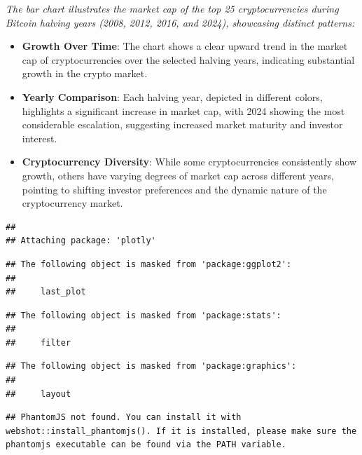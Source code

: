\documentclass[
]{article}
\begin{document}
\emph{The bar chart illustrates the market cap of the top 25
cryptocurrencies during Bitcoin halving years (2008, 2012, 2016, and
2024), showcasing distinct patterns:}

\begin{itemize}
\item
  \textbf{Growth Over Time}: The chart shows a clear upward trend in the
  market cap of cryptocurrencies over the selected halving years,
  indicating substantial growth in the crypto market.
\item
  \textbf{Yearly Comparison}: Each halving year, depicted in different
  colors, highlights a significant increase in market cap, with 2024
  showing the most considerable escalation, suggesting increased market
  maturity and investor interest.
\item
  \textbf{Cryptocurrency Diversity}: While some cryptocurrencies
  consistently show growth, others have varying degrees of market cap
  across different years, pointing to shifting investor preferences and
  the dynamic nature of the cryptocurrency market.
\end{itemize}

\begin{verbatim}
## 
## Attaching package: 'plotly'
\end{verbatim}

\begin{verbatim}
## The following object is masked from 'package:ggplot2':
## 
##     last_plot
\end{verbatim}

\begin{verbatim}
## The following object is masked from 'package:stats':
## 
##     filter
\end{verbatim}

\begin{verbatim}
## The following object is masked from 'package:graphics':
## 
##     layout
\end{verbatim}

\begin{verbatim}
## PhantomJS not found. You can install it with webshot::install_phantomjs(). If it is installed, please make sure the phantomjs executable can be found via the PATH variable.
\end{verbatim}
\end{document}
